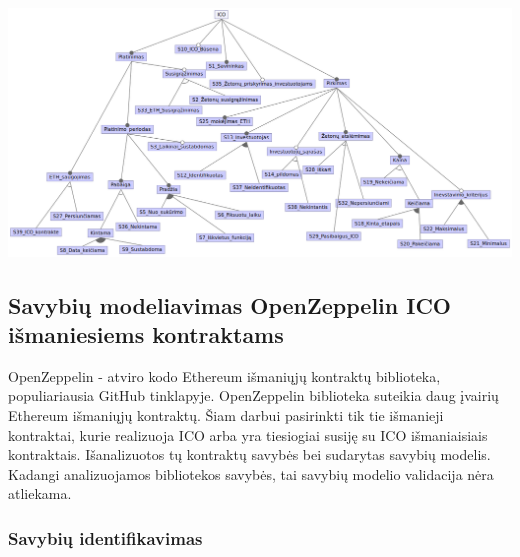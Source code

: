 \documentclass{VUMIFPSbakalaurinis}
\begin{document}
\begin{landscape}

\begin{center}
    \includegraphics[scale=0.7]{img/eth_feature_model}
    \label{img:fm_eth}
\end{center}

\end{landscape}




\subsection{Savybių modeliavimas OpenZeppelin ICO išmaniesiems kontraktams}

OpenZeppelin - atviro kodo Ethereum išmaniųjų kontraktų biblioteka, populiariausia GitHub tinklapyje. OpenZeppelin biblioteka suteikia daug įvairių Ethereum išmaniųjų kontraktų. Šiam darbui pasirinkti tik tie išmanieji kontraktai, kurie realizuoja ICO arba yra tiesiogiai susiję su ICO išmaniaisiais kontraktais. Išanalizuotos tų kontraktų savybės bei sudarytas savybių modelis. Kadangi analizuojamos bibliotekos savybės, tai savybių modelio validacija nėra atliekama.

\subsubsection{Savybių identifikavimas}
\end{document}
